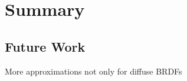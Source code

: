 \chapter{Summary}
\label{ch:summary}

\section{Future Work}
\label{sec:future_work}
More approximations not only for diffuse BRDFs


